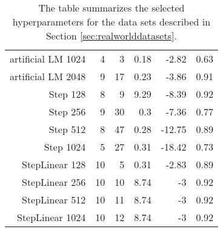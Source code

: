 \begin{table}[!ht]
\begin{flushleft}
\begin{tabular}{rrrrrr}
  artificial LM 1024 & 4 & 3 & 0.18 & -2.82 & 0.63 \\ 
  artificial LM 2048 & 9 & 17 & 0.23 & -3.86 & 0.91 \\ 
   Step  128 & 8 & 9 & 9.29 & -8.39 & 0.92 \\ 
   Step  256 & 9 & 30 & 0.3 & -7.36 & 0.77 \\ 
   Step  512 & 8 & 47 & 0.28 & -12.75 & 0.89 \\ 
   Step  1024 & 5 & 27 & 0.31 & -18.42 & 0.73 \\ 
   StepLinear  128 & 10 & 5 & 0.31 & -2.83 & 0.89 \\ 
   StepLinear  256 & 10 & 10 & 8.74 & -3 & 0.92 \\ 
   StepLinear  512 & 10 & 11 & 8.74 & -3 & 0.92 \\ 
   StepLinear  1024 & 10 & 12 & 8.74 & -3 & 0.92 \\ 
   \hline
\end{tabular}
\caption{The table summarizes the selected hyperparameters for the data sets described in Section \ref{sec:realworlddatasets}.} 
\label{tbl:hyperparameters}
\end{flushleft}
\end{table}
